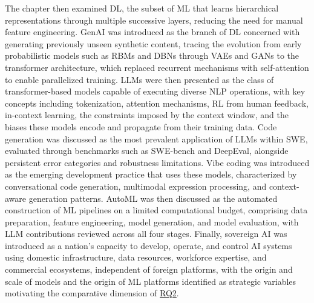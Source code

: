 \documentclass[
english,                 %
bibtex,                  %
]{kththesis}
\numberwithin{listing}{chapter}
\begin{document}
The chapter then examined \gls{DL}, the subset of \gls{ML} that learns hierarchical representations through multiple successive layers, reducing the need for manual feature engineering. \Gls{GenAI} was introduced as the branch of \gls{DL} concerned with generating previously unseen synthetic content, tracing the evolution from early probabilistic models such as \glspl{RBM} and \glspl{DBN} through \glspl{VAE} and \glspl{GAN} to the transformer architecture, which replaced recurrent mechanisms with self-attention to enable parallelized training. \Glspl{LLM} were then presented as the class of transformer-based models capable of executing diverse \gls{NLP} operations, with key concepts including tokenization, attention mechanisms, \gls{RL} from human feedback, in-context learning, the constraints imposed by the context window, and the biases these models encode and propagate from their training data. Code generation was discussed as the most prevalent application of \glspl{LLM} within \gls{SWE}, evaluated through benchmarks such as \gls{SWE}-bench and \gls{DeepEval}, alongside persistent error categories and robustness limitations. Vibe coding was introduced as the emerging development practice that uses these models, characterized by conversational code generation, multimodal expression processing, and context-aware generation patterns. \Gls{AutoML} was then discussed as the automated construction of \gls{ML} pipelines on a limited computational budget, comprising data preparation, feature engineering, model generation, and model evaluation, with \gls{LLM} contributions reviewed across all four stages. Finally, sovereign \gls{AI} was introduced as a nation's capacity to develop, operate, and control \gls{AI} systems using domestic infrastructure, data resources, workforce expertise, and commercial ecosystems, independent of foreign platforms, with the origin and scale of models and the origin of \gls{ML} platforms identified as strategic variables motivating the comparative dimension of \hyperref[rq2]{RQ2}.
\end{document}
